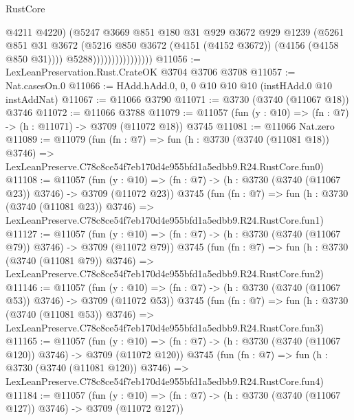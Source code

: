 \begin{lexlean}{RustCore}
\begin{coremodule}
                                    @4211
                                    @4220)
                                  (@5247
                                    @3669
                                    @851
                                    @180
                                    @31
                                    @929
                                    @3672
                                    @929
                                    @1239
                                    (@5261
                                      @851
                                      @31
                                      @3672
                                      (@5216
                                        @850
                                        @3672
                                        (@4151 (@4152 @3672))
                                        (@4156 (@4158 @850 @31))))
                                    @5288))))))))))))))))
@11056 := LexLeanPreservation.Rust.CrateOK @3704 @3706 @3708
@11057 := Nat.casesOn.{0}
@11066 := HAdd.hAdd.{0, 0, 0} @10 @10 @10 (instHAdd.{0} @10 instAddNat)
@11067 := @11066 @3790
@11071 := @3730 (@3740 (@11067 @18)) @3746
@11072 := @11066 @3788
@11079 := @11057 (fun (y : @10) => (fn : @7) -> (h : @11071) -> @3709 (@11072 @18)) @3745
@11081 := @11066 Nat.zero
@11089 := @11079
    (fun (fn : @7) =>
    fun (h : @3730 (@3740 (@11081 @18)) @3746) =>
    LexLeanPreserve.C78c8ce54f7eb170d4e955bfd1a5edbb9.R24.RustCore.fun0)
@11108 := @11057
    (fun (y : @10) => (fn : @7) -> (h : @3730 (@3740 (@11067 @23)) @3746) -> @3709 (@11072 @23))
    @3745
    (fun (fn : @7) =>
    fun (h : @3730 (@3740 (@11081 @23)) @3746) =>
    LexLeanPreserve.C78c8ce54f7eb170d4e955bfd1a5edbb9.R24.RustCore.fun1)
@11127 := @11057
    (fun (y : @10) => (fn : @7) -> (h : @3730 (@3740 (@11067 @79)) @3746) -> @3709 (@11072 @79))
    @3745
    (fun (fn : @7) =>
    fun (h : @3730 (@3740 (@11081 @79)) @3746) =>
    LexLeanPreserve.C78c8ce54f7eb170d4e955bfd1a5edbb9.R24.RustCore.fun2)
@11146 := @11057
    (fun (y : @10) => (fn : @7) -> (h : @3730 (@3740 (@11067 @53)) @3746) -> @3709 (@11072 @53))
    @3745
    (fun (fn : @7) =>
    fun (h : @3730 (@3740 (@11081 @53)) @3746) =>
    LexLeanPreserve.C78c8ce54f7eb170d4e955bfd1a5edbb9.R24.RustCore.fun3)
@11165 := @11057
    (fun (y : @10) => (fn : @7) -> (h : @3730 (@3740 (@11067 @120)) @3746) -> @3709 (@11072 @120))
    @3745
    (fun (fn : @7) =>
    fun (h : @3730 (@3740 (@11081 @120)) @3746) =>
    LexLeanPreserve.C78c8ce54f7eb170d4e955bfd1a5edbb9.R24.RustCore.fun4)
@11184 := @11057
    (fun (y : @10) => (fn : @7) -> (h : @3730 (@3740 (@11067 @127)) @3746) -> @3709 (@11072 @127))

\end{coremodule}
\end{lexlean}
